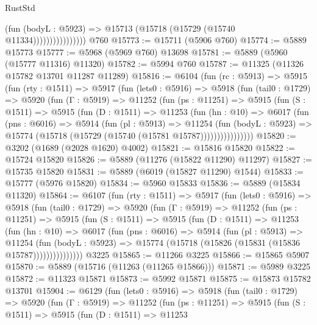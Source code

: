 \begin{lexlean}{RustStd}
\begin{coremodule}
                            (fun (bodyL : @5923) =>
                            @15713 (@15718 (@15729 (@15740 @11334))))))))))))))))
    @760
@15773 := @15711 (@5906 @760)
@15774 := @5889 @15773
@15777 := @5968 (@5969 @760) @13698
@15781 := @5889 (@5960 (@15777 @11316) @11320)
@15782 := @5994 @760
@15787 := @11325 (@11326 @15782 @13701 @11287 @11289)
@15816 := @6104
    (fun (rc : @5913) =>
    @5915
      (fun (rty : @1511) =>
      @5917
        (fun (lets0 : @5916) =>
        @5918
          (fun (tail0 : @1729) =>
          @5920
            (fun (Γ : @5919) =>
            @11252
              (fun (ps : @11251) =>
              @5915
                (fun (S : @1511) =>
                @5915
                  (fun (D : @1511) =>
                  @11253
                    (fun (hn : @10) =>
                    @6017
                      (fun (pns : @6016) =>
                      @5914
                        (fun (pl : @5913) =>
                        @11254
                          (fun (bodyL : @5923) =>
                          @15774 (@15718 (@15729 (@15740 (@15781 @15787))))))))))))))))
@15820 := @3202 (@1689 (@2028 @1620) @4002)
@15821 := @15816 @15820
@15822 := @15724 @15820
@15826 := @5889 (@11276 (@15822 @11290) @11297)
@15827 := @15735 @15820
@15831 := @5889 (@6019 (@15827 @11290) @1544)
@15833 := @15777 (@5976 @15820)
@15834 := @5960 @15833
@15836 := @5889 (@15834 @11320)
@15864 := @6107
    (fun (rty : @1511) =>
    @5917
      (fun (lets0 : @5916) =>
      @5918
        (fun (tail0 : @1729) =>
        @5920
          (fun (Γ : @5919) =>
          @11252
            (fun (ps : @11251) =>
            @5915
              (fun (S : @1511) =>
              @5915
                (fun (D : @1511) =>
                @11253
                  (fun (hn : @10) =>
                  @6017
                    (fun (pns : @6016) =>
                    @5914
                      (fun (pl : @5913) =>
                      @11254
                        (fun (bodyL : @5923) =>
                        @15774 (@15718 (@15826 (@15831 (@15836 @15787)))))))))))))))
    @3225
@15865 := @11266 @3225
@15866 := @15865 @5907
@15870 := @5889 (@15716 (@11263 (@11265 @15866)))
@15871 := @5989 @3225
@15872 := @11323 @15871
@15873 := @5992 @15871
@15875 := @15873 @15782 @13701
@15904 := @6129
    (fun (lets0 : @5916) =>
    @5918
      (fun (tail0 : @1729) =>
      @5920
        (fun (Γ : @5919) =>
        @11252
          (fun (ps : @11251) =>
          @5915
            (fun (S : @1511) =>
            @5915
              (fun (D : @1511) =>
              @11253

\end{coremodule}
\end{lexlean}
